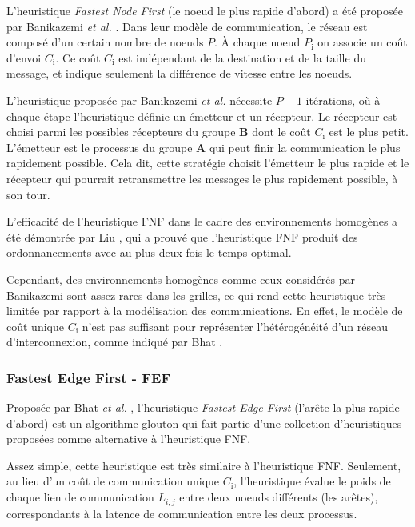 L'heuristique \emph{Fastest Node First} (le noeud le plus rapide d'abord)
a été proposée par Banikazemi \emph{et al.} \cite{Banikazemi98}.
Dans leur modèle de communication, le réseau est composé d'un certain
nombre de noeuds \emph{$P$}. À chaque noeud \emph{$P_{\textrm{i}}$}
on associe un coût d'envoi \emph{$C_{\textrm{i}}$}. Ce coût \emph{$C_{\textrm{i}}$}
est indépendant de la destination et de la taille du message, et indique
seulement la différence de vitesse entre les noeuds.

L'heuristique proposée par Banikazemi \emph{et al.} nécessite $P-1$
itérations, où à chaque étape l'heuristique définie un émetteur et
un récepteur. Le récepteur est choisi parmi les possibles récepteurs
du groupe \textbf{B} dont le coût \emph{$C_{\textrm{i}}$} est le
plus petit. L'émetteur est le processus du groupe \textbf{A} qui peut
finir la communication le plus rapidement possible. Cela dit, cette
stratégie choisit l'émetteur le plus rapide et le récepteur qui pourrait
retransmettre les messages le plus rapidement possible, à son tour.

L'efficacité de l'heuristique FNF dans le cadre des environnements
homogènes a été démontrée par Liu \cite{PangfengLiu00b}, qui a prouvé que
l'heuristique FNF produit des ordonnancements avec au plus deux fois
le temps optimal.

Cependant, des environnements homogènes comme ceux considérés par
Banikazemi sont assez rares dans les grilles, ce qui rend cette heuristique
très limitée par rapport à la modélisation des communications. En
effet, le modèle de coût unique $C_{\textrm{i}}$ n'est pas suffisant
pour représenter l'hétérogénéité d'un réseau d'interconnexion, comme
indiqué par Bhat \cite{Bhat03}. 


\subsubsection*{Fastest Edge First - FEF}

Proposée par Bhat \emph{et al.} \cite{Bhat03}, l'heuristique \emph{Fastest
	Edge First} (l'arête la plus rapide d'abord) est un algorithme glouton
qui fait partie d'une collection d'heuristiques proposées comme alternative
à l'heuristique FNF. 

Assez simple, cette heuristique est très similaire à l'heuristique
FNF. Seulement, au lieu d'un coût de communication unique $C_{\textrm{i}}$,
l'heuristique évalue le poids de chaque lien de communication $L_{i,j}$
entre deux noeuds différents (les arêtes), correspondants à la latence
de communication entre les deux processus. 


